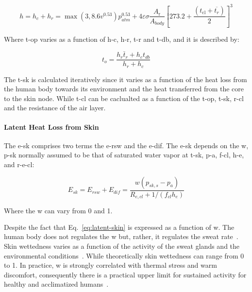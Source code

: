 \begin{equation}
    h=h_{c} + h_{r} = \max(3, 8.6 v^{0.53}) p_{atm}^{0.53} + 4 \varepsilon \sigma \frac{A_{\mathrm{r}}}{A_{body}}\left[273.2+\frac{\left(t_{\mathrm{cl}}+\overline{t_{r}}\right)}{2}\right]^{3}\label{eq:h}
\end{equation}


Where \ac{t-op} varies as a function of \ac{h-c}, \ac{h-r}, \ac{t-r} and \ac{t-db}, and it is described by:

\begin{equation}
    t_{o}=\frac{h_{r} \bar{t}_{r}+h_{c} t_{db}}{h_{r}+h_{c}}\label{eq:t-op}
\end{equation}

The \ac{t-sk} is calculated iteratively since it varies as a function of the heat loss from the human body towards its environment and the heat transferred from the core to the skin node.
While \ac{t-cl} can be caclualted as a function of the \ac{t-op}, \ac{t-sk}, \ac{r-cl} and the resistance of the air layer.

\paragraph{Latent Heat Loss from Skin}

The \ac{e-sk} comprises two terms the \ac{e-rsw} and the \ac{e-dif}.
The \ac{e-sk} depends on the \ac{w}, \ac{p-sk} normally assumed to be that of saturated water vapor at \ac{t-sk}, \ac{p-a}, \ac{f-cl}, \ac{h-e}, and \ac{r-e-cl}:

\begin{equation}
    E_{s k}=E_{rsw}+E_{dif}=\frac{w\left(p_{s k, s}-p_{a}\right)}{R_{e, c l}+1 /\left(f_{c l} h_{e}\right)}\label{eq:latent-skin}
\end{equation}

Where the \ac{w} can vary from 0 and 1.


Despite the fact that Eq.~\ref{eq:latent-skin} is expressed as a function of \ac{w}.
The human body does not regulates the \acl{w} but, rather, it regulates the sweat rate~\cite{ASHRA2017}.
Skin wettedness varies as a function of the activity of the sweat glands and the environmental conditions~\cite{ASHRA2017}.
While theoretically skin wettedness can range from 0 to 1.
In practice, \ac{w} is strongly correlated with thermal stress and warm discomfort, consequently there is a practical upper limit for sustained activity for healthy and acclimatized humans~\cite{ASHRA2017}.


